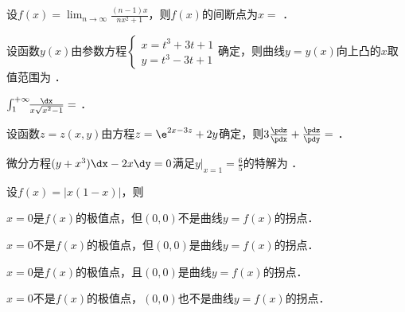 \documentclass[plain,noanswer,medmath]{../../template/jnuexam}
\begin{document}






\begin{problem}
设$f(x) = \lim_{n \to \infty} \frac{(n - 1)x}{nx^2 + 1}$，则$f(x)$的间断点为$x =$ \fillin{}．
\end{problem}


\begin{problem}
设函数$y(x)$由参数方程$\begin{cases}
  x = t^3 + 3t + 1 \\
  y = t^3 - 3t + 1
\end{cases}$确定，则曲线$y = y(x)$向上凸的$x$取值范围为 \fillin{}．
\end{problem}


\begin{problem}
$\int_{1}^{+\infty}\!\!\frac{\dx}{x\sqrt{x^2 - 1}}=$ \fillin{}．
\end{problem}


\begin{problem}
设函数$z = z(x,y)$由方程$z = \e^{2x - 3z} + 2y$确定，则$3\frac{\pdz}{\pdx} + \frac{\pdz}{\pdy} =$ \fillin{}．
\end{problem}


\begin{problem}
微分方程$(y + x^3)\dx - 2x\dy = 0$满足$\left. y \right|_{x = 1} = \frac{6}{5}$的特解为 \fillin{}．
\end{problem}








\begin{problem}
设$f(x) = |x(1 - x)|$，则\pickout{}
\begin{abcd}
\item $x = 0$是$f(x)$的极值点，但$(0,0)$不是曲线$y = f(x)$的拐点．
\item $x = 0$不是$f(x)$的极值点，但$(0,0)$是曲线$y = f(x)$的拐点．
\item $x = 0$是$f(x)$的极值点，且$(0,0)$是曲线$y = f(x)$的拐点．
\item $x = 0$不是$f(x)$的极值点，$(0,0)$也不是曲线$y = f(x)$的拐点．
\end{abcd}
\end{problem}
\end{document}
